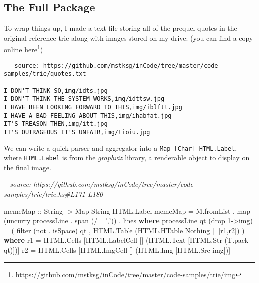 \documentclass[]{article}
\newenvironment{Shaded}{}{}
\newcommand{\CharTok}[1]{\textcolor[rgb]{0.25,0.44,0.63}{#1}}
\newcommand{\CommentTok}[1]{\textcolor[rgb]{0.38,0.63,0.69}{\textit{#1}}}
\newcommand{\DataTypeTok}[1]{\textcolor[rgb]{0.56,0.13,0.00}{#1}}
\newcommand{\DecValTok}[1]{\textcolor[rgb]{0.25,0.63,0.44}{#1}}
\newcommand{\FunctionTok}[1]{\textcolor[rgb]{0.02,0.16,0.49}{#1}}
\newcommand{\KeywordTok}[1]{\textcolor[rgb]{0.00,0.44,0.13}{\textbf{#1}}}
\newcommand{\NormalTok}[1]{#1}
\newcommand{\OtherTok}[1]{\textcolor[rgb]{0.00,0.44,0.13}{#1}}
\renewcommand{\href}[2]{#2\footnote{\url{#1}}}
\begin{document}
\hypertarget{the-full-package}{%
\subsection{The Full Package}\label{the-full-package}}

To wrap things up, I made a text file storing all of the prequel quotes in the
original reference trie along with images stored on my drive: (you can find a
copy
\href{https://github.com/mstksg/inCode/tree/master/code-samples/trie/img}{online
here})

\begin{verbatim}
-- source: https://github.com/mstksg/inCode/tree/master/code-samples/trie/quotes.txt

I DON'T THINK SO,img/idts.jpg
I DON'T THINK THE SYSTEM WORKS,img/idttsw.jpg
I HAVE BEEN LOOKING FORWARD TO THIS,img/iblftt.jpg
I HAVE A BAD FEELING ABOUT THIS,img/ihabfat.jpg
IT'S TREASON THEN,img/itt.jpg
IT'S OUTRAGEOUS IT'S UNFAIR,img/tioiu.jpg
\end{verbatim}

We can write a quick parser and aggregator into a
\texttt{Map\ {[}Char{]}\ HTML.Label}, where \texttt{HTML.Label} is from the
\emph{graphviz} library, a renderable object to display on the final image.

\begin{Shaded}
\begin{Highlighting}[]
\CommentTok{-- source: https://github.com/mstksg/inCode/tree/master/code-samples/trie/trie.hs#L171-L180}

\OtherTok{memeMap ::} \DataTypeTok{String} \OtherTok{->} \DataTypeTok{Map} \DataTypeTok{String} \DataTypeTok{HTML.Label}
\NormalTok{memeMap }\FunctionTok{=}\NormalTok{ M.fromList }\FunctionTok{.}\NormalTok{ map (uncurry processLine }\FunctionTok{.}\NormalTok{ span (}\FunctionTok{/=} \CharTok{','}\NormalTok{)) }\FunctionTok{.}\NormalTok{ lines}
  \KeywordTok{where}
\NormalTok{    processLine qt (drop }\DecValTok{1}\OtherTok{->}\NormalTok{img) }\FunctionTok{=}\NormalTok{ (}
\NormalTok{          filter (not }\FunctionTok{.}\NormalTok{ isSpace) qt}
\NormalTok{        , }\DataTypeTok{HTML.Table}\NormalTok{ (}\DataTypeTok{HTML.HTable} \DataTypeTok{Nothing}\NormalTok{ [] [r1,r2])}
\NormalTok{        )}
      \KeywordTok{where}
\NormalTok{        r1 }\FunctionTok{=} \DataTypeTok{HTML.Cells}\NormalTok{ [}\DataTypeTok{HTML.LabelCell}\NormalTok{ [] (}\DataTypeTok{HTML.Text}\NormalTok{ [}\DataTypeTok{HTML.Str}\NormalTok{ (T.pack qt)])]}
\NormalTok{        r2 }\FunctionTok{=} \DataTypeTok{HTML.Cells}\NormalTok{ [}\DataTypeTok{HTML.ImgCell}\NormalTok{   [] (}\DataTypeTok{HTML.Img}\NormalTok{ [}\DataTypeTok{HTML.Src}\NormalTok{ img])]}
\end{Highlighting}
\end{Shaded}
\end{document}
